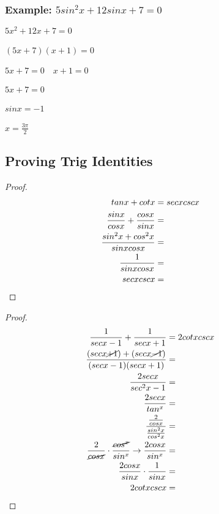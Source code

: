 \documentclass[12pt, english]{article}
\begin{document}
	\subsubsection*{Example: $5sin^2x+12sinx + 7 = 0$}
	$5x^2+12x+7 = 0$ \\
	\\
	$(5x+7)(x + 1) = 0$ \\
	\\
	$5x + 7=0 \quad x+1=0$ \\
	\\
	$5x + 7 = 0$ \\
	\\
	$sinx = -1$ \\
	\\
	$x = \frac{3\pi}{2}$
	\subsection{Proving Trig Identities}
	\begin{proof}
		\begin{align*}
			tanx + cotx &= secxcscx \\
			\frac{sinx}{cosx} + \frac{cosx}{sinx} &= \\
			\frac{sin^2x+cos^2x}{sinxcosx} &= \\
			\frac{1}{sinxcosx} &= \\
			secxcscx &= &&\qedhere
		\end{align*}
	\end{proof}
	\begin{proof}
		\begin{align*}
			\frac{1}{secx-1} + \frac{1}{secx+1} &= 2cotxcscx \\
			\frac{(secx\cancel{+1}) + (secx\cancel{-1})}{(secx - 1)(secx + 1)} &= \\
			\frac{2secx}{sec^2x-1} &= \\
			\frac{2secx}{tan^x} &= \\
			\frac{\frac{2}{cosx}}{\frac{sin^2x}{cos^2x}} &= \\
			\frac{2}{\cancel{cosx}} \cdot \frac{\cancel{cos^x}}{sin^x} \to \frac{2cosx}{sin^x} &= \\
			\frac{2cosx}{sinx} \cdot \frac{1}{sinx} &= \\
			2cotxcscx &= &&\qedhere
		\end{align*}
	\end{proof}
\end{document}
